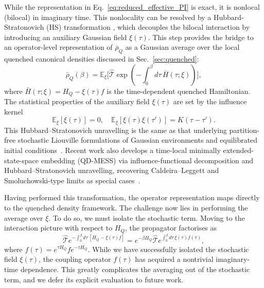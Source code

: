 \documentclass[aps,prl,twocolumn,superscriptaddress,showpacs,floatfix]{revtex4-2}
\begin{document}
While the representation in Eq.~\eqref{eq:reduced_effective_PI} is exact, it is nonlocal (bilocal) in imaginary time. This nonlocality can be resolved by a Hubbard-Stratonovich (HS) transformation \cite{hubbardCalculationPartitionFunctions1959a, stratonovich1957QDistro, XuAnkerholdEPJST2025}, which decouples the bilocal interaction by introducing an auxiliary Gaussian field $\xi(\tau)$. This step provides the bridge to an operator-level representation of $\bar{\rho}_Q$ as a Gaussian average over the local quenched canonical densities discussed in Sec.~\ref{sec:quenched}:
\begin{equation}
    \bar{\rho}_Q(\beta) = \mathbb{E}_\xi\bigg[\hat{\mathcal{T}}\exp\!\left(-\int_0^\beta d\tau\,\bar{H}(\tau;\xi)\right) \bigg],
    \label{eq:bar_rho_as_quenched_average}
\end{equation}
where $\bar{H}(\tau;\xi) = H_Q - \xi(\tau)f$ is the time-dependent quenched Hamiltonian.
The statistical properties of the auxiliary field $\xi(\tau)$ are set by the influence kernel \cite{mccaulPartitionfreeApproachOpen2017c,mccaulDrivingSpinbosonModels2018a,mccaulHowWinFriends2021b}
\begin{equation}
    \mathbb{E}_\xi[\xi(\tau)] = 0, \quad \mathbb{E}_\xi[\xi(\tau)\xi(\tau')] = K(\tau-\tau').
    \label{eq:noise_statistics}
\end{equation}
This Hubbard--Stratonovich unravelling is the same as that underlying partition-free stochastic Liouville formulations of Gaussian environments and equilibrated initial conditions~\cite{mccaulPartitionfreeApproachOpen2017c}. Recent work also develops a time-local minimally extended-state-space embedding (QD-MESS) via influence-functional decomposition and Hubbard–Stratonovich unravelling, recovering Caldeira–Leggett and Smoluchowski-type limits as special cases~\cite{XuAnkerholdEPJST2025}.

Having performed this transformation, the operator representation maps directly to the quenched density framework. The challenge now lies in performing the average over $\xi$. To do so, we must isolate the stochastic term. Moving to the interaction picture with respect to $H_Q$, the propagator factorises as
\begin{equation}
    \hat{\mathcal{T}}e^{-\int_0^\beta d\tau\,[H_Q - \xi(\tau)f]} = e^{-\beta H_Q} \hat{\mathcal{T}}e^{\int_0^\beta d\tau\, \xi(\tau) f(\tau)},
    \label{eq:interaction_picture_split}
\end{equation}
where $f(\tau) = e^{\tau H_Q} f e^{-\tau H_Q}$. While we have successfully isolated the stochastic field $\xi(\tau)$, the coupling operator $f(\tau)$ has acquired a nontrivial imaginary-time dependence. This greatly complicates the averaging out of the stochastic term, and we defer its explicit evaluation to future work. 
\end{document}
